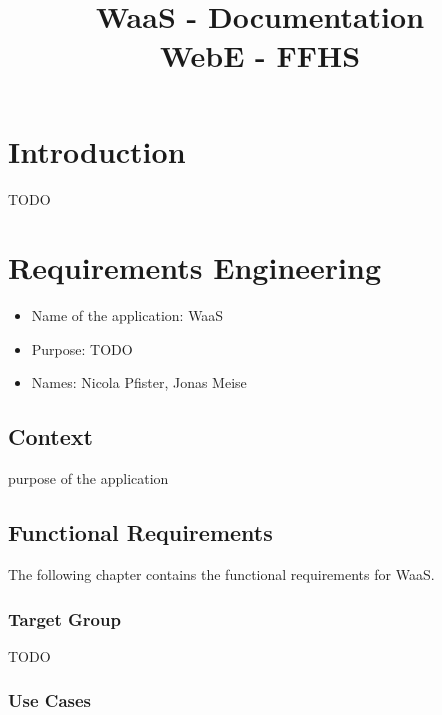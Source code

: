 \documentclass[titlepage, 12pt]{article}
\author{\authorName}
\title{WaaS - Documentation \\ \medskip \large WebE - FFHS}
\begin{document}
\maketitle

\pagebreak

\renewcommand{\contentsname}{Table of Contents}

\tableofcontents

\pagebreak

\section{Introduction}

TODO

\section{Requirements Engineering\label{sectionRequirementsEngineering}}

\begin{itemize}
    \item Name of the application: WaaS
    \item Purpose: TODO
    \item Names: Nicola Pfister, Jonas Meise
\end{itemize}


\subsection{Context}

purpose of the application

\subsection{Functional Requirements}

The following chapter contains the functional requirements for WaaS.

\subsubsection{Target Group}

TODO

\subsubsection{{Use Cases}}
\end{document}
